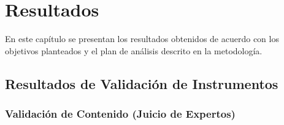 %
%
%
%
%
%
%
%
%
%

\chapter{Resultados}
\label{cap:resultados}


En este capítulo se presentan los resultados obtenidos de acuerdo con los objetivos planteados y el plan de análisis descrito en la metodología.

\section{Resultados de Validación de Instrumentos}
\label{sec:validacion_resultados}


\subsection{Validación de Contenido (Juicio de Expertos)}
\label{subsec:resultados_juicio_expertos}

